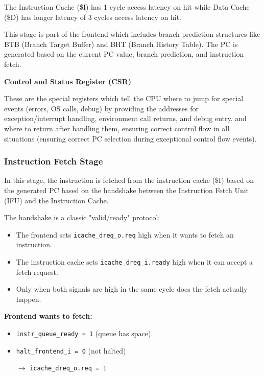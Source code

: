 \documentclass[12pt, a4paper]{article}
\begin{document}
\vspace{0.5em}

The Instruction Cache (\$I) has 1 cycle access latency on hit while Data Cache (\$D) has longer latency of 3 cycles access latency on hit.

This stage is part of the frontend which includes branch prediction structures like BTB (Branch Target Buffer) and BHT (Branch History Table). The PC is generated based on the current PC value, branch prediction, and instruction fetch. 

\vspace{0.5em}

\textbf{Control and Status Register (CSR)}

These are the special registers which tell the CPU where to jump for special events (errors, OS calls, debug) by providing the addresses for exception/interrupt handling, environment call returns, and debug entry. and where to return after handling them, ensuring correct control flow in all situations (ensuring correct PC selection during exceptional control flow events).

\vspace{0.5em}

\subsubsection{Instruction Fetch Stage}

In this stage, the instruction is fetched from the instruction cache (\$I) based on the generated PC based on the handshake between the Instruction Fetch Unit (IFU) and the Instruction Cache. 

\vspace{0.5em}

The handshake is a classic "valid/ready" protocol:
\begin{itemize}[nosep]
    \item The frontend sets \texttt{icache\_dreq\_o.req} high when it wants to fetch an instruction.
    \item The instruction cache sets \texttt{icache\_dreq\_i.ready} high when it can accept a fetch request.
    \item Only when both signals are high in the same cycle does the fetch actually happen.
\end{itemize}


\textbf{Frontend wants to fetch:}
\begin{itemize}[nosep]
    \item \texttt{instr\_queue\_ready = 1} (queue has space)
    \item \texttt{halt\_frontend\_i = 0} (not halted)
    \item[$\rightarrow$] \texttt{icache\_dreq\_o.req = 1}
\end{itemize}
\end{document}
